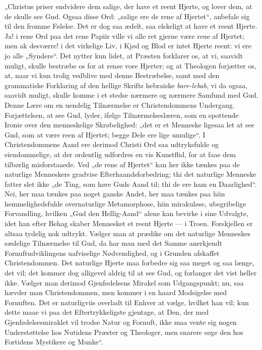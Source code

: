 \documentclass[12pt,a4paper]{book}
\begin{document}
„Christus priser endvidere dem salige, der have et reent Hjerte, og lover dem, at de
skulle see Gud. Ogsaa disse Ord: „salige ere de rene af Hjertet“, anbefale sig til den
fromme Følelse. Det er dog saa ædelt, saa elskeligt at have et reent Hjerte. Ja! i rene
Ord paa det rene Papiir ville vi alle ret gjerne være reue af Hjertet; men ak desværre!
i det virkelige Liv, i Kjød og Blod er intet Hjerte reent: vi ere jo alle „Syndere“.
Det nytter kun lidet, at Præsten forklarer os, at vi, saavidt muligt, skulle bestræbe
os for at rense vore Hjerter; og at Theologen forjætter os, at, naar vi kun trolig
vedblive med denne Bestræbelse, samt med den grammatiske Forklaring af den hellige
Skrifts hebraiske
\textit{bare-lebab}, vi da ogsaa, saavidt muligt, skulle komme i et stedse nærmere og
nærmere Samfund med Gud. Denne Lære om en uendelig Tilnærmelse er Christendommens
Undergang. Forjættelsen, at see Gud, lyder, ifølge Tilnærmelseslæren, som en spottende
Ironie over den menneskelige Skrøbelighed: „det er et Menneske ligesaa let at see Gnd,
som at være reen af Hjertet; begge Dele ere lige umulige“. I Christendommens Aand ere
derimod Christi Ord saa udtryksfulde og eiendommelige, at der ordentlig udfordres en
vis Kunstflid, for at faae dem tilbørlig misforstaaede. Ved „de rene af Hjertet“ kan
her ikke tænkes paa de naturlige Menneskers gradvise Efterhaandsforbedring; thi det
naturlige Menneske fatter slet ikke „de Ting, som høre Guds Aand til; thi de ere ham en
Daarlighed“. Nei, her maa tænkes paa noget ganske Andet, her maa tænkes paa hiin
hemmelighedsfulde overnaturlige Metamorphose, hiin mirakuløse, ubegribelige
Forvandling, hvilken „Gud den Hellig-Aand“ alene kan bevirke i sine Udvalgte, idet han
efter Behag skaber Mennesket et reent Hjerte --- i Troen. Forskjellen er altsaa tydelig
nok udtrykt. Vælger man at prædike om det naturlige Menneskes sædelige Tilnærmelse til
Gud, da har man med det Samme anerkjendt Fornuftudviklingens uafviselige Nødvendighed,
og i Grunden afskaffet Christendommen. Det naturlige Hjerte maa forbedre sig saa meget
og saa længe, det vil; det kommer dog alligevel aldrig til at see Gud, og forlanger det
vist heller ikke. Vælger man derimod Gjenfødelsens Mirakel som Udgangspunkt; nu, saa
hævder man Christendommen, men kommer i en haard Modsigelse med Fornuften. Det er
naturligviis overladt til Enhver at vælge, hvilket han vil; kun dette maae vi paa det
Eftertrykkeligste gjentage, at Den, der med Gjenfødelsesmiraklet vil trodse Natur og
Fornuft, ikke maa vente sig nogen
Understøttelse hos Nutidens Præster og Theologer, men snarere søge den hos Fortidens
Mystikere og Munke“.
\end{document}
